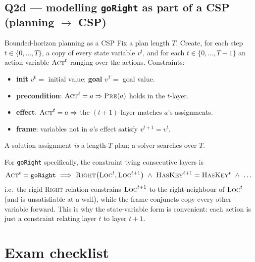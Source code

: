 \documentclass[11pt,a4paper]{article}
\newcommand{\pred}[1]{\textsc{#1}}
\newcommand{\pre}{\textsc{Pre}}
\begin{document}
\subsection*{Q2d --- modelling \texttt{goRight} as part of a CSP (planning $\to$ CSP)}

\begin{defbox}{Bounded-horizon planning as a CSP}
Fix a plan length $T$. Create, for each step $t\in\{0,\dots,T\}$, a copy of every state variable $v^{t}$, and for each $t\in\{0,\dots,T-1\}$ an action variable $\pred{Act}^{t}$ ranging over the actions. Constraints:
\begin{itemize}[leftmargin=*,itemsep=1pt]
  \item \textbf{init} $v^{0}=$ initial value; \textbf{goal} $v^{T}=$ goal value.
  \item \textbf{precondition}: $\pred{Act}^{t}=a \Rightarrow \pre(a)$ holds in the $t$-layer.
  \item \textbf{effect}: $\pred{Act}^{t}=a \Rightarrow$ the $(t{+}1)$-layer matches $a$'s assignments.
  \item \textbf{frame}: variables not in $a$'s effect satisfy $v^{t+1}=v^{t}$.
\end{itemize}
A solution assignment \emph{is} a length-$T$ plan; a solver searches over $T$.
\end{defbox}

For \texttt{goRight} specifically, the constraint tying consecutive layers is
\[
  \pred{Act}^{t}=\texttt{goRight}\ \Longrightarrow\
  \pred{Right}\bigl(\pred{Loc}^{t},\pred{Loc}^{t+1}\bigr)\ \wedge\
  \pred{HasKey}^{t+1}=\pred{HasKey}^{t}\ \wedge\ \dots
\]
i.e.\ the rigid \pred{Right} relation constrains $\pred{Loc}^{t+1}$ to the right-neighbour of $\pred{Loc}^{t}$ (and is unsatisfiable at a wall), while the frame conjuncts copy every other variable forward. This is why the state-variable form is convenient: each action is just a constraint relating layer $t$ to layer $t{+}1$.

\section*{Exam checklist}
\end{document}
